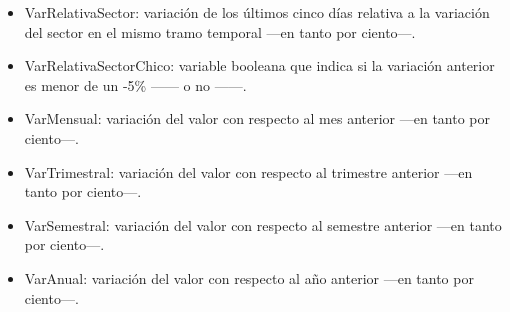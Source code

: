 \documentclass[a4paper, 11pt, titlepage]{article}
\begin{document}
\begin{enumerate}
\begin{itemize}
            \item VarRelativaSector: variación de los últimos cinco días relativa a la variación del sector en el mismo tramo temporal ---en tanto por ciento---.
            \item VarRelativaSectorChico: variable booleana que indica si la variación anterior es menor de un -5\% ------ o no ------.
            \item VarMensual: variación del valor con respecto al mes anterior ---en tanto por ciento---.
            \item VarTrimestral: variación del valor con respecto al trimestre anterior ---en tanto por ciento---.
            \item VarSemestral: variación del valor con respecto al semestre anterior ---en tanto por ciento---.
            \item VarAnual: variación del valor con respecto al año anterior ---en tanto por ciento---.
        \end{itemize}


\end{enumerate}
\end{document}
